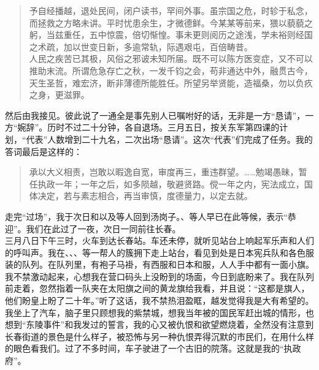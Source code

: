 \begin{quote}
	予自经播越，退处民间，闭户读书，罕间外事。虽宗国之危，时轸于私念，而拯救之方略未讲。平时忧患余生，才微德鲜。今某某等前来，猥以藐藐之躬，当兹重任，五中惊震，倍切惭惶。事未更则阅历之途浅，学未裕则经国之术疏，加以世变日新，多逾常轨，际遇艰屯，百倍畴昔。\\

人民之疾苦已其极，风俗之邪诐未知所届。既不可以陈方医变症，又不可以推助末流。所谓危急存亡之秋，一发千钧之会，苟非通达中外，融贯古今，天生圣哲，难宏济，断非薄德所能胜任。所望另举贤能，造福桑，勿以负疚之身，更滋罪。\\
\end{quote}

然后由我接见。彼此说了一通全是事先别人已嘱咐好的话，无非是一方“恳请”，一方“婉辞”。历时不过二十分钟，各自退场。三月五日，按关东军第四课的计划，“代表”人数增到二十九名，二次出场“恳请”。这次“代表”们完成了任务。我的答词最后是这样的：\\

\begin{quote}
	承以大义相责，岂敢以暇逸自宽，审度再三，重违群望。……勉竭愚昧，暂任执政一年；一年之后，如多陨越，敬避贤路。傥一年之内，宪法成立，国体决定，若与素志相合，再当审慎，度德量力，以定去就。\\
\end{quote}

走完“过场”，我于次日和以及等人回到汤岗子。、等人早已在此等候，表示“恭迎”。我们在此过了一夜，次日一同前往长春。\\

三月八日下午三时，火车到达长春站。车还未停，就听见站台上响起军乐声和人们的呼叫声。我在、、、等一帮人的簇拥下走上站台，看见到处是日本宪兵队和各色服装的队列。在队列里，有袍子马褂，有西服和日本和服，人人手中都有一面小旗。我不禁激动起来，心想我在营口码头上没盼到的场面，今日到底盼来了。我在队列前走着，忽然指着一队夹在太阳旗之间的黄龙旗给我看，并且说：“这都是旗人，他们盼皇上盼了二十年。”听了这话，我不禁热泪盈眶，越发觉得我是大有希望的。\\

我坐上了汽车，脑子里只顾想我的紫禁城，想我当年被的国民军赶出城的情形，也想到“东陵事件”和我发过的誓言，我的心又被仇恨和欲望燃烧着，全然没有注意到长春街道的景色是什么样子，被恐怖与另一种仇恨弄得沉默的市民们，在用什么样的眼色看我们。过了不多时间，车子驶进了一个古旧的院落。这就是我的“执政府”。\\

